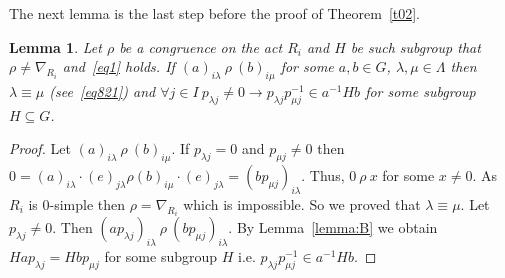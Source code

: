 \documentclass{birkau}
\numberwithin{equation}{section}
\theoremstyle{plain}
\newtheorem{lemma}[theorem]{Lemma}
\theoremstyle{definition}
\begin{document}
	The next lemma is the last step before the proof of Theorem~\ref{t02}.
	
	\begin{lemma} \label{lemma:C}
	    Let $\rho$ be a congruence on the act $R_i$ and $H$ be such subgroup that $\rho \neq \nabla_{R_i}$ and~\eqref{eq1} holds. If $(a)_{i \lambda} \ \rho \ (b)_{i \mu}$ for some $a,b \in G$, $\lambda,\mu \in \Lambda $ then $\lambda \equiv \mu$ (see~\eqref{eq821}) and $\forall j \in I \ p_{\lambda j} \neq 0 \rightarrow p_{\lambda j} p_{\mu j}^{-1} \in a^{-1}Hb$ for some subgroup $H \subseteq G$.
	\end{lemma}
	\begin{proof}
	    Let $(a)_{i \lambda} \ \rho \ (b)_{i \mu}$. If $p_{\lambda j} = 0$ and $p_{\mu j} \neq 0$ then $0 = (a)_{i \lambda} \cdot (e)_{j \lambda} \rho (b)_{i \mu} \cdot (e)_{j \lambda} = (bp_{\mu j})_{i \lambda}$. Thus, $0 \ \rho \ x$ for some $x \neq 0$. As $R_i$ is 0-simple then $\rho = \nabla_{R_i}$ which is impossible. So we proved that $\lambda \equiv \mu$. Let $p_{\lambda j} \neq 0$. Then $(ap_{\lambda j})_{i \lambda} \ \rho \ (bp_{\mu j})_{i \lambda}.$ By Lemma~\ref{lemma:B} we obtain $Hap_{\lambda j} = Hbp_{\mu j}$ for some subgroup $H$ i.e. $p_{\lambda j} p_{\mu j}^{-1} \in a^{-1}Hb$.
	\end{proof}
	
\end{document}
